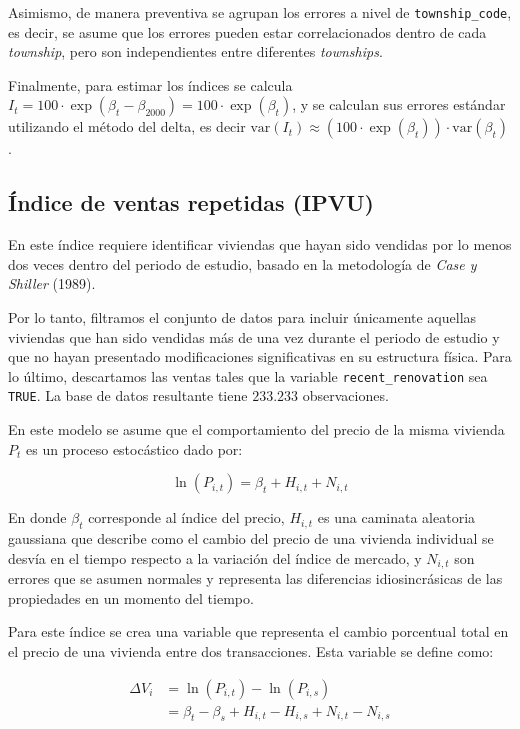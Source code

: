 \documentclass[conference]{IEEEtran}
\begin{document}
Asimismo, de manera preventiva se agrupan los errores a nivel de \texttt{township\_code}, es decir, se asume que los errores pueden estar correlacionados 
dentro de cada \textit{township}, pero son independientes entre diferentes \textit{townships}.

Finalmente, para estimar los índices se calcula $I_t = 100 \cdot \exp(\beta_t - \beta_{2000}) = 100 \cdot \exp(\beta_t)$, y se calculan sus errores estándar utilizando el método del delta, 
es decir $\text{var}(I_t) \approx (100 \cdot \exp(\beta_t)) \cdot \text{var}(\beta_t)$.


\subsection{Índice de ventas repetidas (IPVU)}

En este índice requiere identificar viviendas que hayan sido vendidas por lo
menos dos veces dentro del periodo de estudio, basado en la metodología de \textit{Case y Shiller} (1989).

Por lo tanto, filtramos el conjunto de datos para incluir únicamente aquellas viviendas que han sido vendidas más de una vez
durante el periodo de estudio y que no hayan presentado modificaciones significativas en
su estructura física. Para lo último, descartamos las ventas tales que la variable \texttt{recent\_renovation} sea \texttt{TRUE}. 
La base de datos resultante tiene $233.233$ observaciones. 

En este modelo se asume que el comportamiento del precio de la misma vivienda
$P_t$ es un proceso estocástico dado por:

\[ \ln(P_{i,t}) = \beta_t + H_{i,t} + N_{i, t}\] 

En donde $\beta_t$ corresponde al índice del precio, $H_{i, t}$ es una caminata aleatoria
gaussiana que describe como el cambio del precio de una vivienda individual se desvía en
el tiempo respecto a la variación del índice de mercado, y $N_{i, t}$ son errores que se asumen 
normales y representa las diferencias idiosincrásicas de las propiedades en un momento
del tiempo.

Para este índice se crea una variable que representa el cambio porcentual total en el precio de una vivienda entre dos transacciones. Esta variable se define como:

\begin{align*}
  \Delta V_i &= \ln(P_{i,t})-\ln(P_{i,s})\\
  &= \beta_t - \beta_s + H_{i,t} - H_{i,s} + N_{i,t} - N_{i,s}\\
\end{align*}
\end{document}
